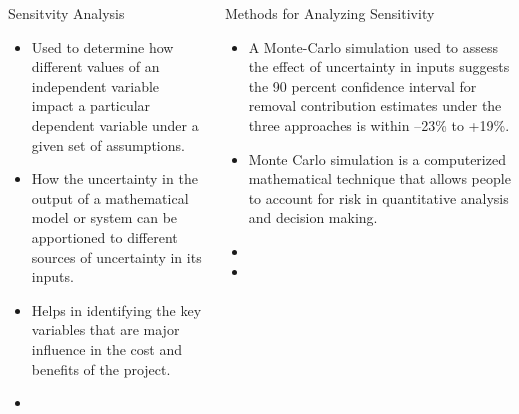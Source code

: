 \documentclass[final]{beamer}\usepackage[]{graphicx}\usepackage[]{color}
\newlength{\onecolwid}
\newlength{\twocolwid}
\begin{document}
\begin{frame}[t]
\begin{columns}[t]
\begin{column}{\twocolwid}
\begin{columns}[t,totalwidth=\twocolwid]
\begin{column}{\onecolwid}
\begin{block}{Sensitvity Analysis}
\begin{itemize}
\item Used to determine how different values of an independent variable impact a particular dependent variable under a given set of assumptions. 
\item How the uncertainty in the output of a mathematical model or system can be apportioned to different sources of uncertainty in its inputs.
\item Helps in identifying the key variables that are major influence in the cost and benefits of the project.
\item 
\end{itemize}

\end{block}


\end{column} %

\begin{column}{\onecolwid} %


\begin{block}{Methods for Analyzing Sensitivity}
\begin{itemize}
\item A Monte-Carlo simulation used to assess the effect of uncertainty in inputs suggests the 90 percent confidence interval for removal contribution estimates under the three approaches is within –23\% to +19\%.
\vspace{2ex}
\item Monte Carlo simulation is a computerized mathematical technique that allows people to account for risk in quantitative analysis and decision making.
\item
\item
\end{itemize}
\end{block}


\end{column} %


\end{columns}
\end{column}
\end{columns}
\end{frame}
\end{document}
